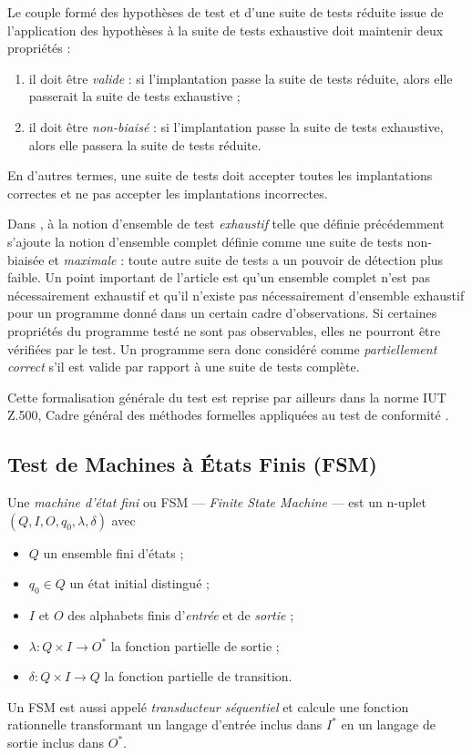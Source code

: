 Le couple form\'e des hypoth\`eses de test et
d'une suite de tests r\'eduite issue de l'application des
hypoth\`eses  \`a la
suite de tests exhaustive doit maintenir deux propri\'et\'es :
\begin{enumerate}
  \item il doit \^etre \emph{valide} : si l'implantation
  passe la suite de tests r\'eduite, alors elle passerait la suite de tests
  exhaustive ;
\item il doit \^etre \emph{non-biais\'e} : si
  l'implantation passe  la suite de tests exhaustive, alors elle
  passera la suite de tests r\'eduite.
\end{enumerate}
En d'autres termes, une suite de tests doit accepter toutes
les implantations  correctes et ne  pas accepter les implantations
incorrectes.

Dans \cite{formspectest}, \`a la
notion d'ensemble de test \emph{exhaustif} telle que 
d\'efinie pr\'ec\'edemment s'ajoute la notion d'ensemble complet
d\'efinie comme une suite de tests non-biais\'ee et \emph{maximale}
 : toute autre  suite de tests a un pouvoir de d\'etection plus
faible. Un point important de l'article est qu'un ensemble complet
n'est pas n\'ecessairement exhaustif et qu'il n'existe  pas
n\'ecessairement d'ensemble exhaustif pour un programme donn\'e dans
un certain cadre d'observations. Si certaines
propri\'et\'es du programme test\'e ne sont pas
observables, elles ne pourront \^etre v\'erifi\'ees par le test. Un
programme sera donc consid\'er\'e comme \emph{partiellement correct}
s'il est valide par rapport \`a une suite de tests compl\`ete.

Cette formalisation g\'en\'erale du test est reprise par ailleurs
dans la norme \textsf{IUT Z.500}\cite{itu-z500}, \og Cadre g\'en\'eral des
m\'ethodes formelles appliqu\'ees au test de conformit\'e \fg.

\subsection{Test de Machines \`a \'Etats Finis (\textsf{FSM})}

Une \emph{machine d'\'etat fini} ou \textsf{FSM} --- \emph{Finite
State Machine} --- est un n-uplet $(Q,I,O,q_0,\lambda,\delta)$
avec
\begin{itemize}
  \item $Q$ un ensemble fini d'\'etats ;
  \item $q_0 \in Q$ un \'etat initial distingu\'e ;
  \item $I$ et $O$ des alphabets finis d'\emph{entr\'ee} et de
  \emph{sortie} ;
\item $\lambda : Q\times{}I \rightarrow O^*$ la fonction partielle de sortie ;
\item $\delta : Q\times{}I \rightarrow Q$ la fonction partielle de transition.
\end{itemize}
Un \textsf{FSM} est aussi appel\'e
\emph{transducteur s\'equentiel}\cite{berstel,sakarovitch} et calcule
une  fonction rationnelle transformant un langage d'entr\'ee inclus dans $I^*$ en un 
langage de sortie inclus dans $O^*$. 

